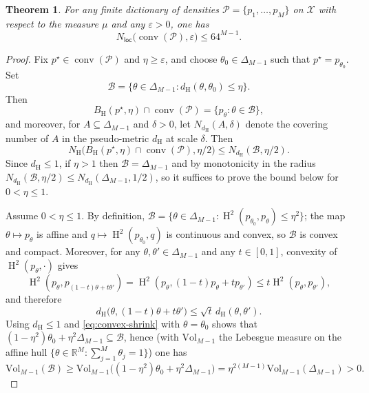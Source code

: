 \documentclass[11pt]{article}
\newcommand{\R}{\mathbb R}
\newcommand{\vol}{\mathrm{Vol}}
\renewcommand{\le}{\leqslant}
\renewcommand{\ge}{\geqslant}
\newcommand{\M}{M}
\newcommand{\nloc}{N_{\mathsf{loc}}}
\newcommand{\conv}{\mathop{\mathrm{conv}}}
\renewcommand{\triangleq}{=}
\newcommand{\hel}{\operatorname{H}}
\newcommand{\hels}{\hel^2}
\newtheorem{theorem}{Theorem}
\theoremstyle{definition}
\theoremstyle{remark}
\begin{document}
\begin{theorem}
  \label{thm:local-entropy-mixtures}
  For any finite dictionary of densities $\mathcal{P}=\{p_1,\dots,p_\M\}$ on $\mathcal X$ with respect to the measure $\mu$ and any $\varepsilon>0$, one has
  \[
  \nloc\big(\conv(\mathcal P),\varepsilon\big)\le 64^{\M-1}.
  \]
\end{theorem}

\begin{proof}
Fix $p^\star\in\conv(\mathcal P)$ and $\eta\ge\varepsilon$, and choose $\theta_0\in\Delta_{\M-1}$ such that $p^\star=p_{\theta_0}$. Set
\[
\mathcal{B} \triangleq \{\theta\in\Delta_{\M-1}: d_{\hel}(\theta,\theta_0)\le \eta\}.
\]
Then
\[
B_{\hel}(p^\star,\eta)\cap\conv(\mathcal P)=\{p_\theta:\theta\in \mathcal{B}\},
\]
and moreover, for $A\subseteq\Delta_{\M-1}$ and $\delta>0$, let $N_{d_{\hel}}(A,\delta)$ denote the covering number of $A$ in the pseudo-metric $d_{\hel}$ at scale $\delta$. Then
\begin{equation}\label{eq:cover-transfer}
N_{\hel}\big(B_{\hel}(p^\star,\eta)\cap\conv(\mathcal P),\eta/2\big)\le N_{d_{\hel}}(\mathcal{B},\eta/2).
\end{equation}
Since $d_{\hel}\le 1$, if $\eta>1$ then $\mathcal{B}=\Delta_{\M-1}$ and by monotonicity in the radius $N_{d_{\hel}}(\mathcal{B},\eta/2)\le N_{d_{\hel}}(\Delta_{\M-1},1/2)$, so it suffices to prove the bound below for $0<\eta\le 1$.

Assume $0<\eta\le 1$. By definition, $\mathcal{B}=\{\theta\in\Delta_{\M-1}:\hels(p_{\theta_0},p_\theta)\le \eta^2\}$; the map $\theta\mapsto p_\theta$ is affine and $q\mapsto \hels(p_{\theta_0},q)$ is continuous and convex, so $\mathcal{B}$ is convex and compact. Moreover, for any $\theta,\theta'\in\Delta_{\M-1}$ and any $t\in[0,1]$, convexity of $\hels(p_\theta,\cdot)$ gives
\[
\hels\left(p_\theta,p_{(1-t)\theta+t\theta'}\right)
=\hels\left(p_\theta,(1-t)p_\theta+tp_{\theta'}\right)\le t\hels(p_\theta,p_{\theta'}),
\]
and therefore
\begin{equation}\label{eq:convex-shrink}
d_{\hel}\big(\theta,(1-t)\theta+t\theta'\big)\le \sqrt{t}\,d_{\hel}(\theta,\theta').
\end{equation}
Using $d_{\hel}\le 1$ and \eqref{eq:convex-shrink} with $\theta=\theta_0$ shows that $(1-\eta^2)\theta_0+\eta^2\Delta_{\M-1}\subseteq \mathcal{B}$, hence (with $\vol_{\M-1}$ the Lebesgue measure on the affine hull $\{\theta\in\R^M:\sum_{j=1}^M\theta_j=1\}$) one has
\[
\vol_{\M-1}(\mathcal{B})\ge \vol_{\M-1}\big((1-\eta^2)\theta_0+\eta^2\Delta_{\M-1}\big)=\eta^{2(M-1)}\vol_{\M-1}(\Delta_{\M-1})>0.
\]


\end{proof}
\end{document}
